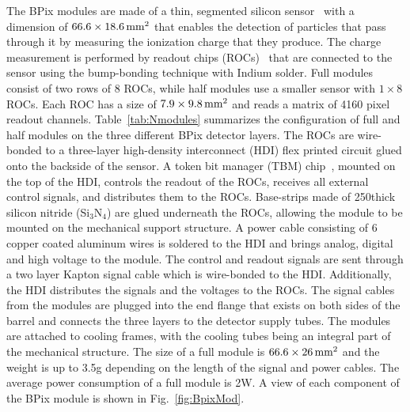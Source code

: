 The BPix modules are made of a thin, segmented silicon sensor~\cite{Allkofer200825} with a dimension of $66.6\times18.6\,\text{mm}^2$ that enables the detection of particles that pass through it by measuring the ionization charge that they produce.
The charge measurement is performed by readout chips (ROCs)~\cite{Kastli:2005jj} that are connected to the sensor using the bump-bonding technique with Indium solder.
Full modules consist of two rows of 8 ROCs, while half modules use a smaller sensor with $1\times8$ ROCs.
Each ROC has a size of $7.9\times9.8\,\text{mm}^2$ and reads a matrix of 4160 pixel readout channels.
Table~\ref{tab:Nmodules} summarizes the configuration of full and half modules on the three different BPix detector layers.
The ROCs are wire-bonded to a three-layer high-density interconnect (HDI) flex printed circuit glued onto the backside of the sensor.
A token bit manager (TBM) chip~\cite{Bartz:920426}, mounted on the top of the HDI, controls the readout of the ROCs, receives all external control signals, and distributes them to the ROCs.
Base-strips made of 250\mum thick silicon nitride (Si$_3$N$_4$) are glued underneath the ROCs, allowing the module to be mounted on the mechanical support structure.
A power cable consisting of 6 copper coated aluminum wires is soldered to the HDI and brings analog, digital and high voltage to the module.
The control and readout signals are sent through a two layer Kapton signal cable which is wire-bonded to the HDI.
Additionally, the HDI distributes the signals and the voltages to the ROCs.
The signal cables from the modules are plugged into the end flange that exists on both sides of the barrel and connects the three layers to the detector supply tubes. 
The modules are attached to cooling frames, with the cooling tubes being an integral part of the mechanical structure.
The size of a full module is $66.6\times26\,\text{mm}^2$ and the weight is up to 3.5\unit{g} depending on the length of the signal and power cables.
The average power consumption of a full module is 2\unit{W}. A view of each component of the BPix module is shown in Fig.~\ref{fig:BpixMod}.

